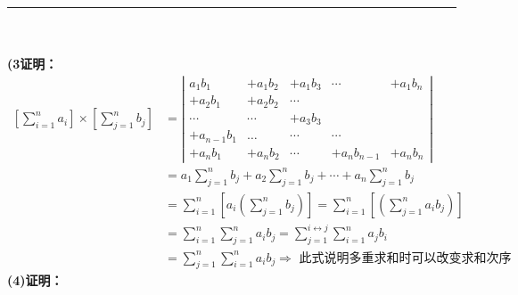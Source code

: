 \documentclass[fontset=windows]{article}
\begin{document}
    \noindent\rule{\textwidth}{1pt}\\
    \vspace{3pt}\\
    \textbf{(3证明：}
    \begin{align}
        \left[\sum_{i=1}^{n} a_{i}\right]\times\left[\sum_{j=1}^{n} b_{j}\right]
        &=\left|
        \begin{array}{ccccc}
            a_{1} b_{1} & +a_{1} b_{2} & +a_{1} b_{3} & \cdots & +a_{1} b_{n} \\
            +a_{2} b_{1} & +a_{2} b_{2} & \cdots & \\
            \cdots & \cdots & +a_{3} b_{3} & & \\
            +a_{n-1} b_{1} & \ldots & \cdots & \cdots & \\
            +a_{n} b_{1} & +a_{n} b_{2} & \cdots & +a_{n} b_{n-1} & +a_{n} b_{n}
        \end{array}\right| \nonumber\\
        &=a_{1} \sum_{j=1}^{n} b_{j}+a_{2} \sum_{j=1}^{n} b_{j}+\cdots+a_{n} \sum_{j=1}^{n} b_{j} \nonumber\\
        &=\sum_{i=1}^{n}\left[a_{i}\left(\sum_{j=1}^{n} b_{j}\right)\right]
        =\sum_{i=1}^{n}\left[\left(\sum_{j=1}^{n} a_{i} b_{j}\right)\right] \nonumber\\
        &=\sum_{i=1}^{n} \sum_{j=1}^{n} a_{i} b_{j}=\sum_{j=1}^{i \leftrightarrow j} \sum_{i=1}^{n} a_{j} b_{i} \nonumber\\
        &=\sum_{j=1}^{n} \sum_{i=1}^{n} a_{i} b_{j}\Longrightarrow\text { 此式说明多重求和时可以改变求和次序 }\nonumber
    \end{align}
    \clearpage
    \newpage
    \noindent\textbf{(4)证明：}\\
\end{document}
